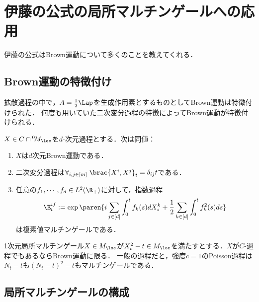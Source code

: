 \documentclass[uplatex,dvipdfmx]{jsreport}
\begin{document}
\section{伊藤の公式の局所マルチンゲールへの応用}

\begin{tcolorbox}[colframe=ForestGreen, colback=ForestGreen!10!white,breakable,colbacktitle=ForestGreen!40!white,coltitle=black,fonttitle=\bfseries\sffamily,
title=]
    伊藤の公式はBrown運動について多くのことを教えてくれる．
\end{tcolorbox}

\subsection{Brown運動の特徴付け}

\begin{tcolorbox}[colframe=ForestGreen, colback=ForestGreen!10!white,breakable,colbacktitle=ForestGreen!40!white,coltitle=black,fonttitle=\bfseries\sffamily,
title=]
    拡散過程の中で，$A=\frac{1}{2}\Lap$を生成作用素とするものとしてBrown運動は特徴付けられた．
    何度も用いていた二次変分過程の特徴によってBrown運動が特徴付けられる．
\end{tcolorbox}

\begin{theorem}[Levy]
    $X\in C\cap {}^0\!M_\loc$を$d$-次元過程とする．次は同値：
    \begin{enumerate}
        \item $X$は$d$次元Brown運動である．
        \item 二次変分過程は$\forall_{i,j\in[m]}\;\brac{X^i,X^j}_t=\delta_{ij}t$である．
        \item 任意の$f_1,\cdots,f_d\in L^2(\R_+)$に対して，指数過程
        \[\E^{if}_t:=\exp\paren{i\sum_{j\in[d]}\int^t_0f_k(s)dX^k_s+\frac{1}{2}\sum_{k\in[d]}\int^t_0f^2_k(s)ds}\]
        は複素値マルチンゲールである．
    \end{enumerate}
\end{theorem}
\begin{remarks}
    1次元局所マルチンゲール$X\in M_\loc$が$X^2_t-t\in M_\loc$を満たすとする．$X$が$C$-過程でもあるならBrown運動に限る．
    一般の過程だと，強度$c=1$のPoisson過程は$N_t-t$も$(N_t-t)^2-t$もマルチンゲールである．
\end{remarks}

\subsection{局所マルチンゲールの構成}
\end{document}
